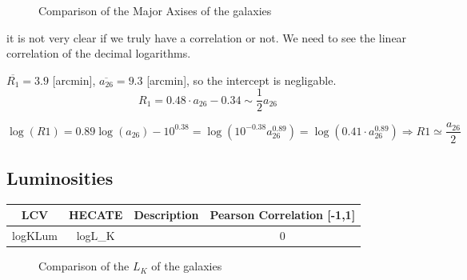 \documentclass[
]{article}
\begin{document}
\begin{figure}
\begin{minipage}{0.50\linewidth}
{}


\end{minipage}%

\caption{\label{fig-axis-compare}Comparison of the Major Axises of the
galaxies}

\end{figure}%

it is not very clear if we truly have a correlation or not. We need to
see the linear correlation of the decimal logarithms.

\(\overline{R_1} = 3.9\) {[}arcmin{]}, \(\overline{a_{26}} = 9.3\)
{[}arcmin{]}, so the intercept is negligable. \[
R_1 = 0.48\cdot a_{26}-0.34 \sim \frac{1}{2}a_{26}
\]

\[
\log(R1) = 0.89\log(a_{26})-10^{0.38} = \log(10^{-0.38}a_{26}^{0.89}) = \log(0.41\cdot a_{26}^{0.89})\Rightarrow R1\simeq \frac{a_{26}}{2}
\]

\subsection{Luminosities}\label{luminosities}

\begin{longtable}[]{@{}cccc@{}}
\toprule\noalign{}
LCV & HECATE & Description & Pearson Correlation {[}-1,1{]} \\
\midrule\noalign{}
\endhead
\bottomrule\noalign{}
\endlastfoot
logKLum & logL\_K & & 0 \\
\end{longtable}

\begin{figure}


\caption{\label{fig-klum-compare}Comparison of the \(L_K\) of the
galaxies}

\end{figure}%
\end{document}
